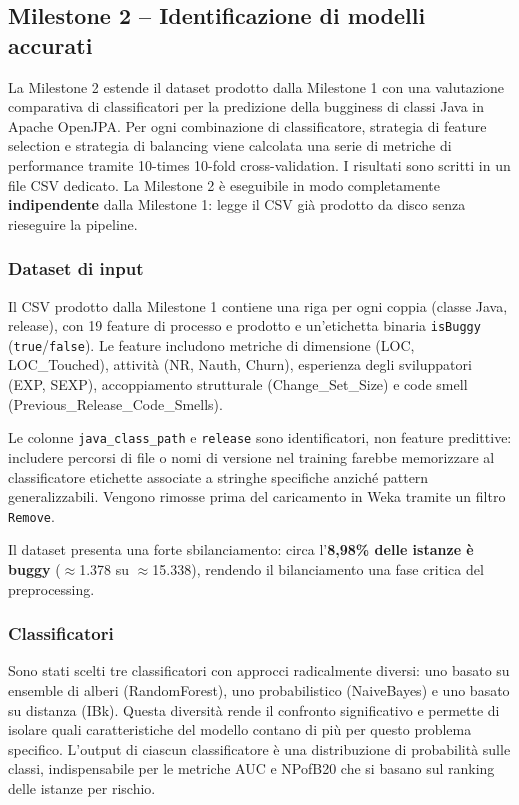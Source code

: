 \subsection{Milestone 2 -- Identificazione di modelli accurati}

La Milestone 2 estende il dataset prodotto dalla Milestone 1 con una valutazione
comparativa di classificatori per la predizione della bugginess di classi Java in Apache
OpenJPA. Per ogni combinazione di classificatore, strategia di feature selection e
strategia di balancing viene calcolata una serie di metriche di performance tramite
10-times 10-fold cross-validation. I risultati sono scritti in un file CSV dedicato.
La Milestone 2 è eseguibile in modo completamente \textbf{indipendente} dalla Milestone
1: legge il CSV già prodotto da disco senza rieseguire la pipeline.

\subsubsection{Dataset di input}

Il CSV prodotto dalla Milestone 1 contiene una riga per ogni coppia (classe Java,
release), con 19 feature di processo e prodotto e un'etichetta binaria \texttt{isBuggy}
(\texttt{true}/\texttt{false}). Le feature includono metriche di dimensione (LOC,
LOC\_Touched), attività (NR, Nauth, Churn), esperienza degli sviluppatori (EXP, SEXP),
accoppiamento strutturale (Change\_Set\_Size) e code smell (Previous\_Release\_Code\_Smells).

Le colonne \texttt{java\_class\_path} e \texttt{release} sono identificatori, non feature
predittive: includere percorsi di file o nomi di versione nel training farebbe memorizzare
al classificatore etichette associate a stringhe specifiche anziché pattern generalizzabili.
Vengono rimosse prima del caricamento in Weka tramite un filtro \texttt{Remove}.

Il dataset presenta una forte sbilanciamento: circa l'\textbf{8,98\% delle istanze è
buggy} ($\approx$1.378 su $\approx$15.338), rendendo il bilanciamento una fase critica
del preprocessing.

\subsubsection{Classificatori}

Sono stati scelti tre classificatori con approcci radicalmente diversi: uno basato su
ensemble di alberi (RandomForest), uno probabilistico (NaiveBayes) e uno basato su
distanza (IBk). Questa diversità rende il confronto significativo e permette di isolare
quali caratteristiche del modello contano di più per questo problema specifico. L'output
di ciascun classificatore è una distribuzione di probabilità sulle classi, indispensabile
per le metriche AUC e NPofB20 che si basano sul ranking delle istanze per rischio.

